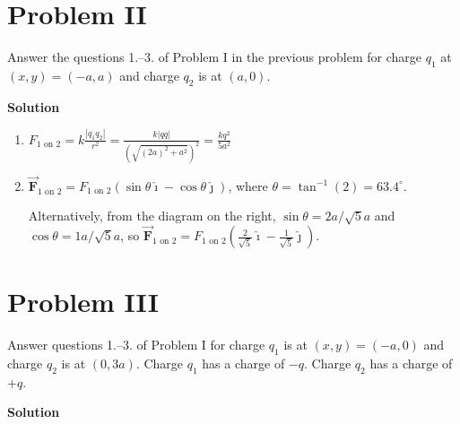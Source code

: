 \documentclass{article}
\renewcommand{\mbox}{\text}
\newcommand{\ds}[0]{\displaystyle}
\newcommand{\ihat}[0]{\hat{\boldsymbol{\imath}}}
\newcommand{\jhat}[0]{\hat{\boldsymbol{\jmath}}}
\newcommand{\bfvec}[1]{\vec{\mathbf{#1}}}
\begin{document}


\newpage
\fi

\section{Problem II}

Answer the questions 1.--3. of Problem I in the previous problem for charge $q_1$ at $(x,y)=(-a,a)$ and charge $q_2$ is at $(a, 0)$.

\ifsolutions
{\bf Solution}



    \begin{enumerate}

      \item $\ds F_{1\mbox{ on } 2}=k\frac{|q_1q_2|}{r^2}=\frac{k|qq|}{(\sqrt{(2a)^2+a^2})^2}=\frac{kq^2}{5a^2}$

      \item $\bfvec{F}_{1\mbox{ on } 2} = F_{1\mbox{ on } 2}(\sin \theta \ihat - \cos \theta\jhat)$, where $\theta=\tan^{-1}(2) = 63.4^\circ$.

                Alternatively, from the diagram on the right, $\sin\theta = 2a/\sqrt{5}a$ and $\cos\theta = 1a/\sqrt{5}a$, so 
                $\ds\bfvec{F}_{1\mbox{ on } 2} = F_{1\mbox{ on } 2}\left(\frac{2}{\sqrt{5}}\ihat - \frac{1}{\sqrt{5}}\jhat\right)$.

    \end{enumerate}
\else


\fi

\newpage

\section{Problem III}

Answer questions 1.--3. of Problem I for charge $q_1$ is at $(x,y)=(-a,0)$ and charge $q_2$ is at $(0, 3a)$. Charge $q_1$ has a charge of $-q$. Charge $q_2$ has a charge of $+q$.

\ifsolutions
{\bf Solution}

\end{document}
